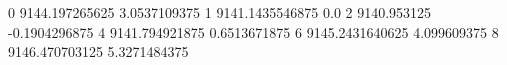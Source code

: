 0 9144.197265625 3.0537109375
1 9141.1435546875 0.0
2 9140.953125 -0.1904296875
4 9141.794921875 0.6513671875
6 9145.2431640625 4.099609375
8 9146.470703125 5.3271484375
